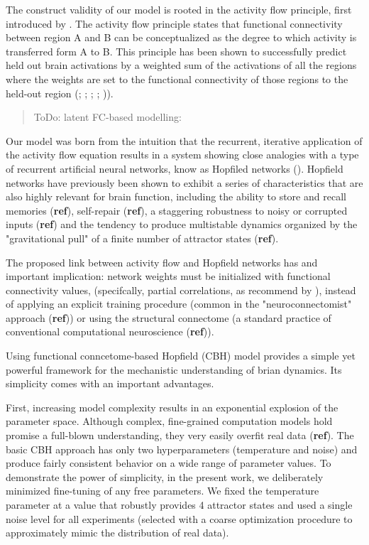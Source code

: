 \documentclass{article}
\begin{document}
The construct validity of our model is rooted in the activity flow principle, first introduced by \href{https://doi.org/10.1038/nn.4406}{}. The activity flow principle states that functional connectivity between region A and B can be conceptualized as the degree to which activity is transferred form A to B. This principle has been shown to successfully predict held out brain activations by a weighted sum of the activations of all the regions where the weights are set to the functional connectivity of those regions to the held-out region (\cite{Cole_2016}; \href{https://doi.org/10.1038/s41467-017-01000-w}{}; \href{https://doi.org/10.1371/journal.pbio.3001686}{}; \cite{Hearne_2021}; \href{https://doi.org/10.1089/brain.2018.0586}{})).

\begin{quote}
ToDo: latent FC-based modelling: \href{https://doi.org/10.1162/netn\_a\_00234}{}
\end{quote}

Our model was born from the intuition that the recurrent, iterative application of the activity flow equation results in a system showing close analogies with a type of recurrent artificial neural networks, know as Hopfiled networks (\cite{Hopfield_1982}).
Hopfield networks have previously been shown to exhibit a series of characteristics that are also highly relevant for brain function, including the ability to store and recall memories (\textbf{ref}), self-repair (\textbf{ref}), a staggering robustness to noisy or corrupted inputs (\textbf{ref}) and the tendency to produce multistable dynamics organized by the "gravitational pull" of a finite number of attractor states (\textbf{ref}).

The proposed link between activity flow and Hopfield networks has and important implication: network weights must be initialized with functional connectivity values, (specifcally, partial correlations, as recommend by \cite{Cole_2016}), instead of applying an explicit training procedure (common in the "neuroconnectomist" approach (\textbf{ref})) or using the structural connectome (a standard practice of conventional computational neuroscience (\textbf{ref})).

Using functional conncetome-based Hopfield (CBH) model provides a simple yet powerful framework for the mechanistic understanding of brian dynamics. Its simplicity comes with an important advantages.

First, increasing model complexity results in an exponential explosion of the parameter space. Although complex, fine-grained computation models hold promise a full-blown understanding, they very easily overfit real data (\textbf{ref}). The basic CBH approach has only two hyperparameters (temperature and noise) and produce fairly consistent behavior on a wide range of parameter values. To demonstrate the power of simplicity, in the present work, we deliberately minimized fine-tuning of any free parameters. We fixed the temperature parameter at a value that robustly provides 4 attractor states and used a single noise level for all experiments (selected with a coarse optimization procedure to approximately mimic the distribution of real data).
\end{document}
